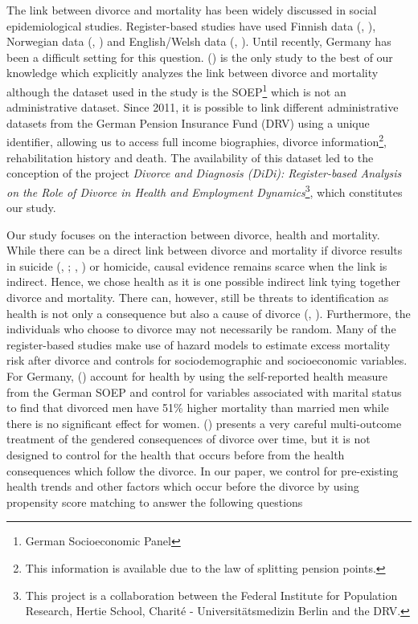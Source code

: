 \documentclass[a4paper,12pt]{article}
\theoremstyle{plain}
\theoremstyle{definition}
\theoremstyle{TheoremNum}
\theoremstyle{CorollaryNum}
\theoremstyle{PropositionNum}
\theoremstyle{TheoremNum}
\begin{document}
The link between divorce and mortality has been widely discussed in social epidemiological studies. Register-based studies have used Finnish data (\citeauthor{metsa2013short}, \citeyear{metsa2013short}), Norwegian data (\citeauthor{berntsen2012relationship}, \citeyear{berntsen2012relationship}) and  English/Welsh data (\citeauthor{grundy2010marital}, \citeyear{grundy2010marital}). Until recently, Germany has been a difficult setting for this question. \citeauthor{brockmann2004love} (\citeyear{brockmann2004love}) is the only study to the best of our knowledge which explicitly analyzes the link between divorce and mortality although the dataset used in the study is the SOEP\footnote{German Socioeconomic Panel} which is not an administrative dataset. Since 2011, it is possible to link different administrative datasets from the German Pension Insurance Fund (DRV) using a unique identifier, allowing us to access full income biographies, divorce information\footnote{This information is available due to the law of splitting pension points.}, rehabilitation history and death. The availability of this dataset led to the conception of the project \textit{Divorce and Diagnosis (DiDi): Register-based Analysis on the Role of Divorce in Health and Employment Dynamics}\footnote{This project is a collaboration between the Federal Institute for Population Research, Hertie School, Charit\'{e} - Universit\"{a}tsmedizin Berlin and the DRV.}, which constitutes our study. 

Our study focuses on the interaction between divorce, health and mortality. While there can be a direct link between divorce and mortality if divorce results in suicide (\citeauthor{kposowa2000marital}, \citeyear{kposowa2000marital}; \citeauthor{stevenson2006bargaining}, \citeyear{stevenson2006bargaining}) or homicide, causal evidence remains scarce when the link is indirect. Hence, we chose health as it is one possible indirect link tying together divorce and mortality. There can, however, still be threats to identification as health is not only a consequence but also a cause of divorce  (\citeauthor*{torvik2015health}, \citeyear{torvik2015health}). Furthermore, the individuals who choose to divorce may not necessarily be random. Many of the register-based studies make use of hazard models to estimate excess mortality risk after divorce and controls for sociodemographic and socioeconomic variables. For Germany, \citeauthor{brockmann2004love} (\citeyear{brockmann2004love}) account for health by using the self-reported health measure from the German SOEP and control for variables associated with marital status to find that divorced men have 51\% higher mortality than married men while there is no significant effect for women. \citeauthor{leopold2018gender} (\citeyear{leopold2018gender}) presents a very careful multi-outcome treatment of the gendered consequences of divorce over time, but it is not designed to control for the health that occurs before from the health consequences which follow the divorce. In our paper, we control for pre-existing health trends and other factors which occur before the divorce by using propensity score matching to answer the following questions
\end{document}
